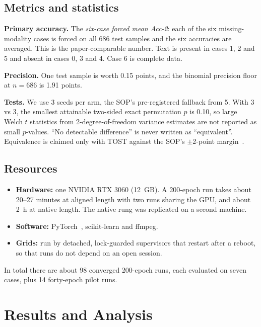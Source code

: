 \documentclass[lettersize,journal]{IEEEtran}
\begin{document}
\subsection{Metrics and statistics}
\textbf{Primary accuracy.} The \emph{six-case forced mean Acc-2}: each of the six missing-modality cases is forced on all 686 test samples and the six accuracies are averaged. This is the paper-comparable number. Text is present in cases 1, 2 and 5 and absent in cases 0, 3 and 4. Case 6 is complete data.

\textbf{Precision.} One test sample is worth 0.15 points, and the binomial precision floor at $n=686$ is 1.91 points.

\textbf{Tests.} We use 3 seeds per arm, the SOP's pre-registered fallback from 5. With 3 vs 3, the smallest attainable two-sided exact permutation $p$ is 0.10, so large Welch $t$ statistics from 2-degree-of-freedom variance estimates are not reported as small $p$-values. ``No detectable difference'' is never written as ``equivalent''. Equivalence is claimed only with TOST against the SOP's $\pm$2-point margin~\cite{schuirmann1987tost}.

\subsection{Resources}
\begin{itemize}
\item \textbf{Hardware:} one NVIDIA RTX 3060 (12~GB). A 200-epoch run takes about 20--27 minutes at aligned length with two runs sharing the GPU, and about 2~h at native length. The native rung was replicated on a second machine.
\item \textbf{Software:} PyTorch~\cite{paszke2019pytorch}, scikit-learn and ffmpeg.
\item \textbf{Grids:} run by detached, lock-guarded supervisors that restart after a reboot, so that runs do not depend on an open session.
\end{itemize}
In total there are about 98 converged 200-epoch runs, each evaluated on seven cases, plus 14 forty-epoch pilot runs.

\section{Results and Analysis}\label{sec:results}
\end{document}
